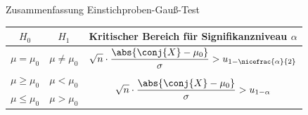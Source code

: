 \begin{bonus}{Zusammenfassung Einstichproben-Gauß-Test}
    \begin{center}
        \begin{tabular}{|c|c|c|}
            \hline
            $H_0$                          & $H_1$                             & Kritischer Bereich für Signifikanzniveau $\alpha$                                                                    \\
            \hline
            \multirow{2}{*}{$\mu = \mu_0$} & \multirow{2}{*}{$\mu \neq \mu_0$} & \multirow{2}{*}{$\displaystyle \sqrt{n} \cdot \frac{\abs{\conj{X} - \mu_0}}{\sigma} > u_{1 - \nicefrac{\alpha}{2}}$} \\
                                           &                                   &                                                                                                                      \\
            \hline
            $\mu \geq \mu_0$               & $\mu < \mu_0$                     & \multirow{2}{*}{$\displaystyle \sqrt{n} \cdot \frac{\abs{\conj{X} - \mu_0}}{\sigma} > u_{1 - \alpha}$}               \\
            $\mu \leq \mu_0$               & $\mu > \mu_0$                     &                                                                                                                      \\
            \hline
        \end{tabular}
    \end{center}
\end{bonus}

